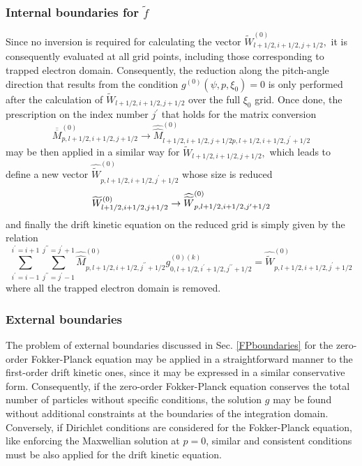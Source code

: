 \subsubsection{Internal boundaries for $\widetilde{f}$}

Since no inversion is required for calculating the vector $\widetilde{W}%
_{l+1/2,i+1/2,j+1/2}^{\left( 0\right) },$ it is consequently evaluated at
all grid points, including those corresponding to trapped electron domain.
Consequently, the reduction along the pitch-angle direction that results
from the condition $g^{\left( 0\right) }\left( \psi ,p,\xi _{0}\right) =0$
is only performed after the calculation of $\widetilde{W}%
_{l+1/2,i+1/2,j+1/2} $ over the full $\xi _{0}$ grid. Once done, the
prescription on the index number $j^{\prime }$ that holds for the matrix
conversion
\begin{equation}
\overline{\overline{M}}_{p,l+1/2,i+1/2,j+1/2}^{\left( 0\right) }\rightarrow
\widehat{\widehat{M}}_{l+1/2,i+1/2,j+1/2p,l+1/2,i+1/2,j^{\prime
}+1/2}^{\left( 0\right) }
\end{equation}
may be then applied in a similar way for $\widetilde{W}_{l+1/2,i+1/2,j+1/2},$
which leads to define a new vector $\widehat{\widetilde{W}}%
_{p,l+1/2,i+1/2,j^{\prime }+1/2}^{\left( 0\right) }$ whose size is reduced
\begin{equation}
\widetilde{W}_{l+1/2,i+1/2,j+1/2}^{\left( 0\right) }\rightarrow \widehat{%
\widetilde{W}}_{p,l+1/2,i+1/2,j^{\prime }+1/2}^{\left( 0\right) }
\end{equation}
and finally the drift kinetic equation on the reduced grid is simply given
by the relation
\begin{equation}
\sum_{i^{\prime }=i-1}^{i^{\prime }=i+1}\sum_{j^{\prime \prime }=j^{\prime
}-1}^{j^{\prime \prime }=j^{\prime }+1}\widehat{\widehat{M}}%
_{p,l+1/2,i+1/2,j^{\prime \prime }+1/2}^{\left( 0\right)
}g_{0,l+1/2,i^{\prime }+1/2,j^{\prime \prime }+1/2}^{\left( 0\right) (k)}=%
\widehat{\widetilde{W}}_{p,l+1/2,i+1/2,j^{\prime }+1/2}^{\left( 0\right) }
\end{equation}
where all the trapped electron domain is removed.

\subsubsection{External boundaries}

The problem of external boundaries discussed in Sec. \ref{FPboundaries} for
the zero-order Fokker-Planck equation may be applied in a straightforward
manner to the first-order drift kinetic ones, since it may be expressed in a
similar conservative form. Consequently, if the zero-order Fokker-Planck
equation conserves the total number of particles without specific
conditions, the solution $g$ may be found without additional constraints at
the boundaries of the integration domain. Conversely, if Dirichlet
conditions are considered for the Fokker-Planck equation, like enforcing the
Maxwellian solution at $p=0$, similar and consistent conditions must be also
applied for the drift kinetic equation.
